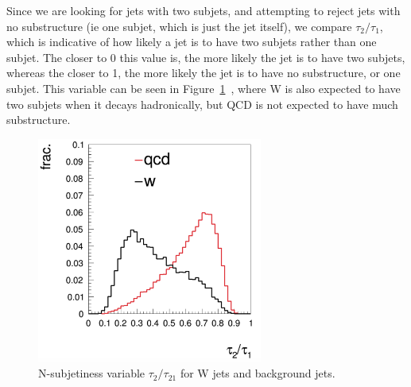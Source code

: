 Since we are looking for jets with two subjets, and attempting to reject jets with no substructure (ie one subjet, which is just the jet itself), we compare $\tau_2/\tau_1$, which is indicative of how likely a jet is to have two subjets rather than one subjet. The closer to 0 this value is, the more likely the jet is to have two subjets, whereas the closer to 1, the more likely the jet is to have no substructure, or one subjet. This variable can be seen in Figure~\ref{Fig:tau21}~\cite{Khanpour:2014xla}, where W is also expected to have two subjets when it decays hadronically, but QCD is not expected to have much substructure.
\begin{figure}[h!]
    \centering
        \includegraphics[width=0.66\textwidth]{F4/tau21.png}
        \caption{N-subjetiness variable $\tau_2/\tau_21$ for W jets and background jets.}
        \label{Fig:tau21}
\end{figure}
\vspace{5mm}

